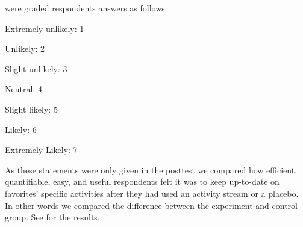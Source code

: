 were graded respondents answers as follows: 

\begin{items}
  \item Extremely unlikely: 1
  \item Unlikely: 2
  \item Slight unlikely: 3
  \item Neutral: 4
  \item Slight likely: 5
  \item Likely: 6
  \item Extremely Likely: 7
\end{items}

As these statements were only given in the
posttest we compared how efficient, quantifiable, easy, and useful respondents
felt it was to
keep up-to-date on favorites' specific activities after they had used
an activity stream or a placebo. In other words we compared the difference
between the experiment and control group.
See
 for the results.

